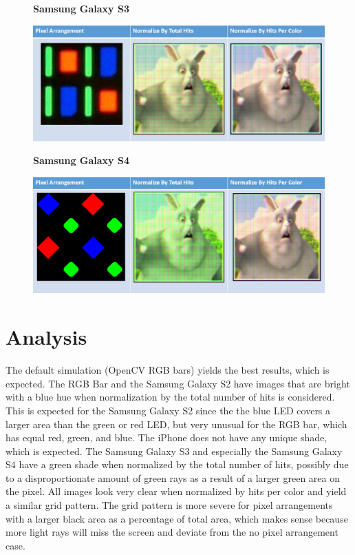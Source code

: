 \begin{figure}
    \centering
    \textbf{Samsung Galaxy S3}\par\medskip
    \includegraphics[width=6in]{chapters/chapter7/images/Samsung_Galaxy_S3.png}
\end{figure}

\begin{figure}
    \centering
    \textbf{Samsung Galaxy S4}\par\medskip
    \includegraphics[width=6in]{chapters/chapter7/images/Samsung_Galaxy_S4.png}
\end{figure}

\newpage
\section{Analysis}

The default simulation (OpenCV RGB bars) yields the best results, which is expected. The RGB Bar and the Samsung Galaxy S2 have images that are bright with a blue hue when normalization by the total number of hits is considered. This is expected for the Samsung Galaxy S2 since the the blue LED covers a larger area than the green or red LED, but very unusual for the RGB bar, which has equal red, green, and blue. The iPhone does not have any unique shade, which is expected. The Samsung Galaxy S3 and especially the Samsung Galaxy S4 have a green shade when normalized by the total number of hits, possibly due to a disproportionate amount of green rays as a result of a larger green area on the pixel. All images look very clear when normalized by hits per color and yield a similar grid pattern. The grid pattern is more severe for pixel arrangements with a larger black area as a percentage of total area, which makes sense because more light rays will miss the screen and deviate from the no pixel arrangement case.

